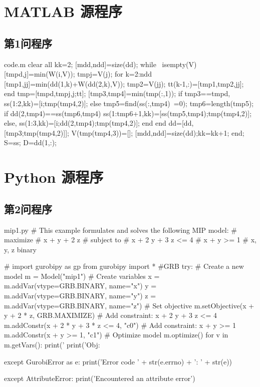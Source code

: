 \documentclass[bwprint]{gmcmthesis}
\begin{document}
\clearpage
\begin{appendices}
\section{MATLAB 源程序}
\renewcommand{\thesubsection}{A\thinskip.\thinskip\arabic{subsection}}
\subsection{第1问程序}
\vspace{-2ex}

\begin{Matlab}{code.m}
clear all
kk=2;
[mdd,ndd]=size(dd);
while ~isempty(V)
    [tmpd,j]=min(W(i,V));
    tmpj=V(j);
    for k=2:ndd
        [tmp1,jj]=min(dd(1,k)+W(dd(2,k),V));
        tmp2=V(jj);
        tt(k-1,:)=[tmp1,tmp2,jj];
    end
    tmp=[tmpd,tmpj,j;tt];
    [tmp3,tmp4]=min(tmp(:,1));
    if tmp3==tmpd,
        ss(1:2,kk)=[i;tmp(tmp4,2)];
    else
        tmp5=find(ss(:,tmp4)~=0);
        tmp6=length(tmp5);
        if dd(2,tmp4)==ss(tmp6,tmp4)
            ss(1:tmp6+1,kk)=[ss(tmp5,tmp4);tmp(tmp4,2)];
        else, ss(1:3,kk)=[i;dd(2,tmp4);tmp(tmp4,2)];
        end
    end
    dd=[dd,[tmp3;tmp(tmp4,2)]];
    V(tmp(tmp4,3))=[];
    [mdd,ndd]=size(dd);kk=kk+1;
end;
S=ss; D=dd(1,:);
\end{Matlab}
\vspace{2ex}

\clearpage
\section{Python 源程序}
\renewcommand{\thesubsection}{B\thinskip.\thinskip\arabic{subsection}}
\subsection{第2问程序}
\vspace{-2ex}
\begin{Python}{mip1.py}
# This example formulates and solves the following  MIP model:
#  maximize
#        x +   y + 2 z
#  subject to
#        x + 2 y + 3 z <= 4
#        x +   y       >= 1
#        x, y, z binary

# import gurobipy as gp
from gurobipy import * #GRB
try:
    # Create a new model
    m = Model("mip1")
    # Create variables
    x = m.addVar(vtype=GRB.BINARY, name="x")
    y = m.addVar(vtype=GRB.BINARY, name="y")
    z = m.addVar(vtype=GRB.BINARY, name="z")
    # Set objective
    m.setObjective(x + y + 2 * z, GRB.MAXIMIZE)
    # Add constraint: x + 2 y + 3 z <= 4
    m.addConstr(x + 2 * y + 3 * z <= 4, "c0")
    # Add constraint: x + y >= 1
    m.addConstr(x + y >= 1, "c1")
    # Optimize model
    m.optimize()
    for v in m.getVars():
        print('%
    print('Obj: %

except GurobiError as e:
    print('Error code ' + str(e.errno) + ': ' + str(e))

except AttributeError:
    print('Encountered an attribute error')
\end{Python}

\end{appendices}
\end{document}
